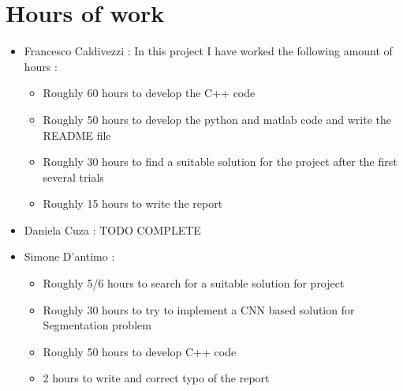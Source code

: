 \section{Hours of work}
    \begin{itemize}
        \item Francesco Caldivezzi : In this project I have worked the following amount of hours : 
        \begin{itemize}
            \item Roughly 60 hours to develop the C++ code
            \item Roughly 50 hours to develop the python and matlab code and write the README file
            \item Roughly 30 hours to find a suitable solution for the project after the first several trials
            \item Roughly 15 hours to write the report
        \end{itemize}
        \item Daniela Cuza : 
            TODO COMPLETE
        \item Simone D'antimo :
        \begin{itemize}
            \item Roughly 5/6 hours to search for a suitable solution for project
            \item Roughly 30 hours to try to implement a CNN based solution for Segmentation problem
            \item Roughly 50 hours to develop C++ code
            \item 2 hours to write and correct typo of the report
        \end{itemize}
    \end{itemize}
